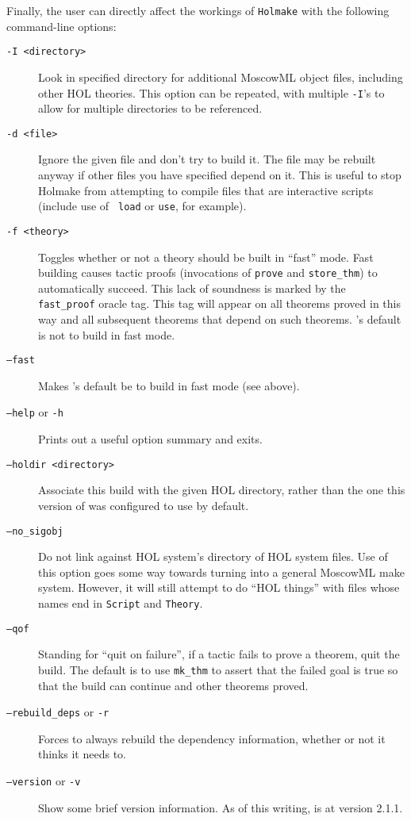 \noindent Finally, the user can directly affect the workings of \verb+Holmake+
with the following command-line options:
\begin{description}
\item[\tt -I <directory>] Look in specified directory for additional
  MoscowML object files, including other HOL theories.  This option
  can be repeated, with multiple {\tt -I}'s to allow for multiple
  directories to be referenced.
\item[\tt -d <file>] Ignore the given file and don't try to build it.
  The file may be rebuilt anyway if other files you have specified
  depend on it.  This is useful to stop Holmake from attempting to
  compile files that are interactive scripts (include use of {\tt
  load} or {\tt use}, for example).
\item[\texttt{-f <theory>}] Toggles whether or not a theory should be
  built in ``fast'' mode.  Fast building causes tactic proofs
  (invocations of \texttt{prove} and \texttt{store\_thm}) to
  automatically succeed.  This lack of soundness is marked by the
  \texttt{fast\_proof} oracle tag.  This tag will appear on all
  theorems proved in this way and all subsequent theorems that depend
  on such theorems.  \holmake's default is not to build in fast mode.
\item[\texttt{--fast}] Makes \holmake's default be to build in fast
  mode (see above).
\item[{\tt --help} or {\tt -h}] Prints out a useful option summary and
  exits.
\item[\tt --holdir <directory>] Associate this build with the given
  HOL directory, rather than the one this version of \holmake{} was
  configured to use by default.
\item[\texttt{--no\_sigobj}] Do not link against HOL system's
  directory of HOL system files.  Use of this option goes some way
  towards turning
  \holmake{} into a general MoscowML \textsf{make} system.  However,
  it will still attempt to do ``HOL things'' with files whose names
  end in \texttt{Script} and \texttt{Theory}.
\item[\texttt{--qof}] Standing for ``quit on failure'', if a tactic
  fails to prove a theorem, quit the build.  The default is to use
  \texttt{mk\_thm} to assert that the failed goal is true so that the
  build can continue and other theorems proved.
\item[{\tt --rebuild\_deps} or {\tt -r}] Forces \holmake{} to
  always rebuild the dependency information, whether or not it thinks
  it needs to.
\item[{\tt --version} or {\tt -v}] Show some brief version
  information.  As of this writing, \holmake{} is at version 2.1.1.
\end{description}

